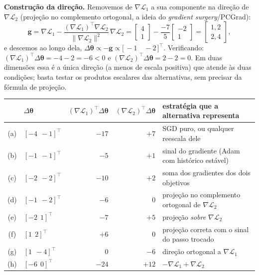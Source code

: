 \documentclass[11pt,a4paper]{article}
\begin{document}
\textbf{Construção da direção.} Removemos de $\nabla\mathcal{L}_1$ a sua componente na direção de $\nabla\mathcal{L}_2$ (projeção no complemento ortogonal, a ideia do \textit{gradient surgery}/PCGrad):
\[
\mathbf{g} = \nabla\mathcal{L}_1 - \frac{(\nabla\mathcal{L}_1)^{\top}\nabla\mathcal{L}_2}{\|\nabla\mathcal{L}_2\|^{2}}\,\nabla\mathcal{L}_2
= \begin{bmatrix} 4 \\ 1 \end{bmatrix} - \frac{-7}{5}\begin{bmatrix} -2 \\ 1 \end{bmatrix}
= \begin{bmatrix} 1{,}2 \\ 2{,}4 \end{bmatrix},
\]
e descemos ao longo dela, $\Delta\boldsymbol{\theta} \propto -\mathbf{g} \propto \bigl[\,-1 \quad -2\,\bigr]^{\top}$. Verificando: $(\nabla\mathcal{L}_1)^{\top}\Delta\boldsymbol{\theta} = -4 - 2 = -6 < 0$ e $(\nabla\mathcal{L}_2)^{\top}\Delta\boldsymbol{\theta} = 2 - 2 = 0$. Em duas dimensões essa é a única direção (a menos de escala positiva) que atende às duas condições; basta testar os produtos escalares das alternativas, sem precisar da fórmula de projeção.

\begin{center}
\begin{tabular}{clrrl}
& $\Delta\boldsymbol{\theta}$ & $(\nabla\mathcal{L}_1)^{\top}\Delta\boldsymbol{\theta}$ & $(\nabla\mathcal{L}_2)^{\top}\Delta\boldsymbol{\theta}$ & estratégia que a alternativa representa \\\hline
(a) & $[-4\ \ -1]^{\top}$ & $-17$ & $+7$ & SGD puro, ou qualquer reescala dele \\
(b) & $[-1\ \ -1]^{\top}$ & $-5$ & $+1$ & sinal do gradiente (Adam com histórico estável) \\
(c) & $[-2\ \ -2]^{\top}$ & $-10$ & $+2$ & soma dos gradientes dos dois objetivos \\
(d) & $[-1\ \ -2]^{\top}$ & $-6$ & $0$ & projeção no complemento ortogonal de $\nabla\mathcal{L}_2$ \\
(e) & $[-2\ \ 1]^{\top}$ & $-7$ & $+5$ & projeção \emph{sobre} $\nabla\mathcal{L}_2$ \\
(f) & $[1\ \ 2]^{\top}$ & $+6$ & $0$ & projeção correta com o sinal do passo trocado \\
(g) & $[1\ \ -4]^{\top}$ & $0$ & $-6$ & direção ortogonal a $\nabla\mathcal{L}_1$ \\
(h) & $[-6\ \ 0]^{\top}$ & $-24$ & $+12$ & $-\nabla\mathcal{L}_1 + \nabla\mathcal{L}_2$ \\
\end{tabular}
\end{center}
\end{document}
